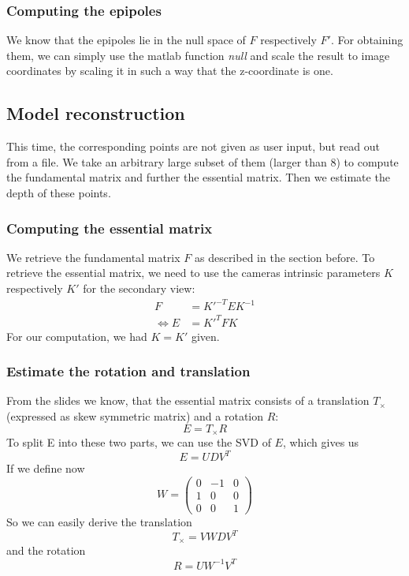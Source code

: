 \documentclass{paper}
\begin{document}
\subsubsection{Computing the epipoles}
We know that the epipoles lie in the null space of $F$ respectively $F'$. For
obtaining them, we can simply use the matlab function \emph{null} and scale 
the result to image coordinates by scaling it in such a way that 
the z-coordinate is one.
 
\subsection{Model reconstruction}
This time, the corresponding points are not given as user input, but
read out from a file. We take an arbitrary large subset of them 
(larger than 8) to compute the fundamental
matrix and further the essential matrix. Then we estimate the depth of these points.

\subsubsection{Computing the essential matrix}
We retrieve the fundamental matrix $F$ as described in the section before. To
retrieve the essential matrix, we need to use the cameras intrinsic parameters $K$ respectively $K'$ for the secondary view:
\begin{align}
	 F &= K'^{-T} E K^{-1} \\
	\Longleftrightarrow E &= K'^T F K
\end{align}
For our computation, we had $K = K'$ given. 
\subsubsection{Estimate the rotation and translation}

From the slides we know, that the essential matrix consists of a translation $T_\times$ (expressed as skew symmetric matrix) and a rotation $R$:
\begin{equation}
	E = T_\times R
\end{equation}
To split E into these two parts, we can use the SVD of $E$, which gives us
\begin{equation}
	E = UDV^T
\end{equation}
If we define now
\begin{equation}
 W = \begin{pmatrix}
 	0 & -1 & 0 \\
 	1 & 0 & 0 \\
 	0 & 0 & 1
 \end{pmatrix}
\end{equation}
So we can easily derive the translation
\begin{equation}
T_\times = V W D V^T
\end{equation}
and the rotation
\begin{equation}
R = U W^{-1} V^T
\end{equation}
\end{document}
